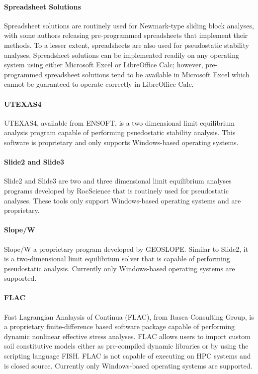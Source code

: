\paragraph{Spreadsheet Solutions}
Spreadsheet solutions are routinely used for Newmark-type sliding block analyses, with some authors releasing pre-programmed spreadsheets that implement their methods. To a lesser extent, spreadsheets are also used for pseudostatic stability analyses. Spreadsheet solutions can be implemented readily on any operating system using either Microsoft Excel or LibreOffice Calc; however, pre-programmed spreadsheet solutions tend to be available in Microsoft Excel which cannot be guaranteed to operate correctly in LibreOffice Calc.

\paragraph{UTEXAS4}
UTEXAS4, available from ENSOFT, is a two dimensional limit equilibrium analysis program capable of performing psuedostatic stability analysis. This software is proprietary and only supports Windows-based operating systems.

\paragraph{Slide2 and Slide3}
Slide2 and Slide3 are two and three dimensional limit equilibrium analyses programs developed by RocScience that is routinely used for pseudostatic analyses. These tools only support Windows-based operating systems and are proprietary.

\paragraph{Slope/W}
Slope/W a proprietary program developed by GEOSLOPE. Similar to Slide2, it is a two-dimensional limit equilibrium solver that is capable of performing pseudostatic analysis. Currently only Windows-based operating systems are supported.

\paragraph{FLAC}
Fast Lagrangian Analaysis of Continua (FLAC), from Itasca Consulting Group, is a proprietary finite-difference based software package capable of performing dynamic nonlinear effective stress analyses. FLAC allows users to import custom soil constitutive models either as pre-compiled dynamic libraries or by using the scripting language FISH. FLAC is not capable of executing on HPC systems and is closed source. Currently only Windows-based operating systems are supported.

